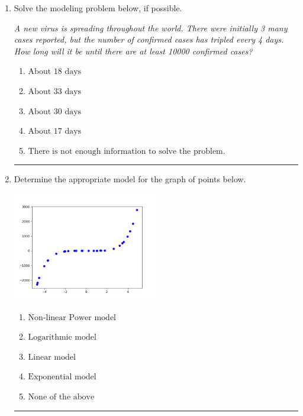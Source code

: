 \documentclass[14pt]{extbook}
\newcommand{\litem}[1]{\item#1\hspace*{-1cm}\rule{\textwidth}{0.4pt}}
\begin{document}
\begin{enumerate}
\litem{
Solve the modeling problem below, if possible.
\begin{center}
    \textit{ A new virus is spreading throughout the world. There were initially 3 many cases reported, but the number of confirmed cases has tripled every 4 days. How long will it be until there are at least 10000 confirmed cases? }
\end{center}
\begin{enumerate}[label=\Alph*.]
\item \( \text{About } 18 \text{ days} \)
\item \( \text{About } 33 \text{ days} \)
\item \( \text{About } 30 \text{ days} \)
\item \( \text{About } 17 \text{ days} \)
\item \( \text{There is not enough information to solve the problem.} \)

\end{enumerate} }
\litem{
Determine the appropriate model for the graph of points below.
\begin{center}
    \includegraphics[width=0.5\textwidth]{../Figures/identifyModelGraph12CopyC.png}
\end{center}
\begin{enumerate}[label=\Alph*.]
\item \( \text{Non-linear Power model} \)
\item \( \text{Logarithmic model} \)
\item \( \text{Linear model} \)
\item \( \text{Exponential model} \)
\item \( \text{None of the above} \)


\end{enumerate}}
\end{enumerate}
\end{document}
